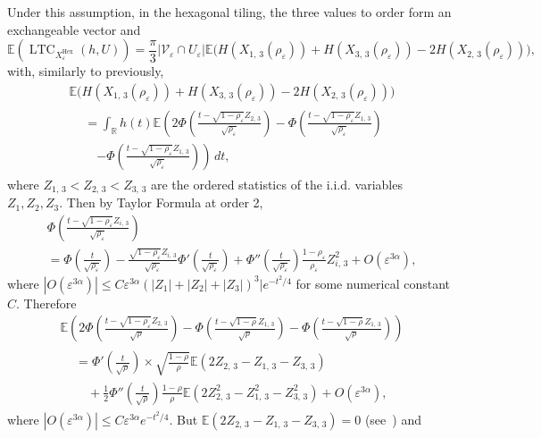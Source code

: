 \documentclass[AHL,Unicode,longabstracts,published]{cedram}
\newcommand{\R}{\mathbb{R}}
\newcommand{\E}{\mathbb{E}}
\newcommand{\eps}{\varepsilon}
\DeclareMathOperator{\LTC}{LTC}
\DeclareMathOperator{\Hex}{Hex}
\newcommand{\calV}{\mathcal{V}}
\begin{document}
Under this assumption, in the hexagonal tiling, the three values to order form an exchangeable vector and
\[
\E\left(\LTC_{X_\eps^{\Hex}}(h,U)\right)=\frac{\pi}{3}\left|\calV_\eps\cap U_\eps\right|\E\big(H(X_{1,\,3}(\rho_\eps))+H(X_{3,\,3}(\rho_\eps)) - 2H(X_{2,\,3}(\rho_\eps))\big),
\]
with, similarly to previously,
\begin{multline*}
\E\big(H(X_{1,\,3}(\rho_\eps))+H(X_{3,\,3}(\rho_\eps)) - 2H(X_{2,\,3}(\rho_\eps))\big)\\
\begin{aligned}
&=\int_\R h(t) \E\left(2\Phi\left(\frac{t-\sqrt{1-\rho_\eps}Z_{2,\,3}}{\sqrt{\rho_\eps}}\right) -\Phi\left(\frac{t-\sqrt{1-\rho_\eps}Z_{1,\,3}}{\sqrt{\rho_\eps}}\right)\right.\\
&\quad\left.-\Phi\left(\frac{t-\sqrt{1-\rho_\eps}Z_{1,\,3}}{\sqrt{\rho_\eps}}\right)\right)\,dt,
\end{aligned}
\end{multline*}
where $Z_{1,\,3}<Z_{2,\,3}<Z_{3,\,3}$ are the ordered statistics of the i.i.d. variables $Z_1, Z_2, Z_3$. Then by Taylor Formula at order 2,
\begin{multline*}
\Phi\left(\frac{t-\sqrt{1-\rho_\eps}Z_{i,\,3}}{\sqrt{\rho_\eps}}\right)\\
=\Phi\left(\frac{t}{\sqrt{\rho_\eps}}\right)-\frac{\sqrt{1-\rho_\eps}Z_{i,\,3}}{\sqrt{\rho_\eps}}\Phi'\left(\frac{t}{\sqrt{\rho_\eps}}\right)+
\Phi''\left(\frac{t}{\sqrt{\rho_\eps}}\right)\frac{{1-\rho_\eps}}{{\rho_\eps}}Z_{i,\,3}^2+O\left(\eps^{3\alpha}\right),
\end{multline*}
where $|O(\eps^{3\alpha})|\le C\eps^{3\alpha}(|Z_1|+|Z_2|+|Z_3|)^3|e^{-t^2/4}$ for some numerical constant $C$. Therefore
\begin{multline*}
\E\left(2\Phi\left(\frac{t-\sqrt{1-\rho_\eps}Z_{2,\,3}}{\sqrt{\rho}}\right)-\Phi\left(\frac{t-\sqrt{1-\rho}Z_{1,\,3}}{\sqrt{\rho}}\right)-\Phi\left(\frac{t-\sqrt{1-\rho}Z_{1,\,3}}{\sqrt{\rho}}\right)\right)
\\
\begin{aligned}
&=\Phi'\left(\frac{t}{\sqrt{\rho}}\right)\times \sqrt{\frac{1-\rho}{\rho}}\E\left(2Z_{2,\,3}-Z_{1,\,3}-Z_{3,\,3}\right)\\
&\quad+\frac{1}{2}\Phi''\left(\frac{t}{\sqrt{\rho}}\right)\frac{1-\rho}{\rho}\E\left(2Z_{2,\,3}^2-Z_{1,\,3}^2-Z_{3,\,3}^2\right)+O\left(\eps^{3\alpha}\right),
\end{aligned}
\end{multline*}
where $|O(\eps^{3\alpha})|\le C\eps^{3\alpha}e^{-t^2/4}$. But $\E(2Z_{2,\,3}-Z_{1,\,3}-Z_{3,\,3})=0$ (see~\cite[p.~101]{Nevzorov}) and
\end{document}
